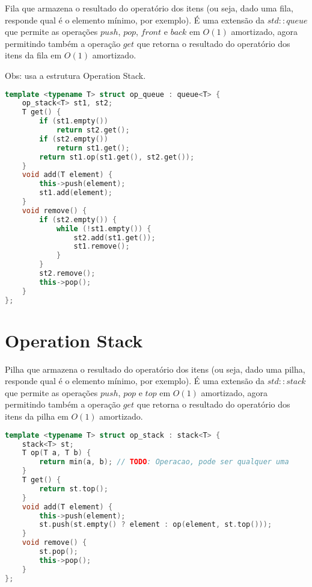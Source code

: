 \documentclass[11pt, a4paper, oneside]{book}
\begin{document}
Fila que armazena o resultado do operatório dos itens (ou seja, dado uma fila, responde qual é o elemento mínimo, por exemplo). É uma extensão da $std::queue$ que permite as operações $push$, $pop$, $front$ e $back$ em $O(1)$ amortizado, agora permitindo também a operação $get$ que retorna o resultado do operatório dos itens da fila em $O(1)$ amortizado.



Obs: usa a estrutura Operation Stack.

\hfill

\begin{multicols}{2}
\begin{lstlisting}[language=C++]
template <typename T> struct op_queue : queue<T> {
    op_stack<T> st1, st2;
    T get() {
        if (st1.empty())
            return st2.get();
        if (st2.empty())
            return st1.get();
        return st1.op(st1.get(), st2.get());
    }
    void add(T element) {
        this->push(element);
        st1.add(element);
    }
    void remove() {
        if (st2.empty()) {
            while (!st1.empty()) {
                st2.add(st1.get());
                st1.remove();
            }
        }
        st2.remove();
        this->pop();
    }
};
\end{lstlisting}
\end{multicols}

\hfill

\section{Operation Stack}


Pilha que armazena o resultado do operatório dos itens (ou seja, dado uma pilha, responde qual é o elemento mínimo, por exemplo). É uma extensão da $std::stack$ que permite as operações $push$, $pop$ e $top$ em $O(1)$ amortizado, agora permitindo também a operação $get$ que retorna o resultado do operatório dos itens da pilha em $O(1)$ amortizado.

\hfill

\begin{multicols}{2}
\begin{lstlisting}[language=C++]
template <typename T> struct op_stack : stack<T> {
    stack<T> st;
    T op(T a, T b) {
        return min(a, b); // TODO: Operacao, pode ser qualquer uma
    }
    T get() {
        return st.top();
    }
    void add(T element) {
        this->push(element);
        st.push(st.empty() ? element : op(element, st.top()));
    }
    void remove() {
        st.pop();
        this->pop();
    }
};\end{lstlisting}
\end{multicols}
\end{document}
